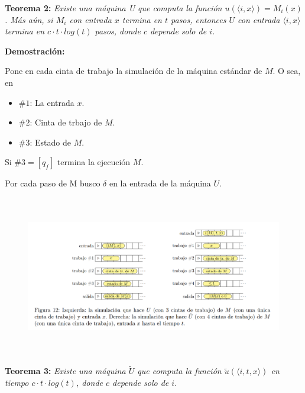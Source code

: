 \documentclass{article}
\begin{document}
\begin{flushleft}
  \textbf{\hypertarget{teo2}{Teorema 2:}}
  \textit{Existe una máquina U que computa la función $u(\langle i,x \rangle) = M_i(x)$. Más aún, 
  si $M_i$ con entrada $x$ termina en $t$ pasos, entonces $U$ con entrada $\langle i,x \rangle$ termina
  en $c \cdot t \cdot  log(t)$ pasos, donde $c$ depende solo de $i$.}
\end{flushleft}

\begin{flushleft}
  \textbf{\textcolor{Mulberry}{Demostración:}}

  Pone en cada cinta de trabajo la simulación de la máquina estándar de $M$. O sea, en 
  
  \begin{itemize}
    \item $\#1$: La entrada $x$.
    \item $\#2$: Cinta de trbajo de $M$.
    \item $\#3$: Estado de $M$.
  \end{itemize}

  Si $\#3 = [q_f]$ termina la ejecución $M$.

  Por cada paso de M busco $\delta$ en la entrada de la máquina $U$.

  \begin{figure}[h] 
    \centering 
    \includegraphics[width=17cm, height=7cm]{./imagenes/simulacion_con_maq_universal.png}
  \end{figure}
\end{flushleft}

\begin{flushleft}
  \textbf{Teorema 3:}
  \textit{Existe una máquina $\widetilde{U}$ que computa la función $\widetilde{u}(\langle i,t,x \rangle)$
  en tiempo $c \cdot t \cdot log(t)$, donde $c$ depende solo de $i$.}
\end{flushleft}
\end{document}
